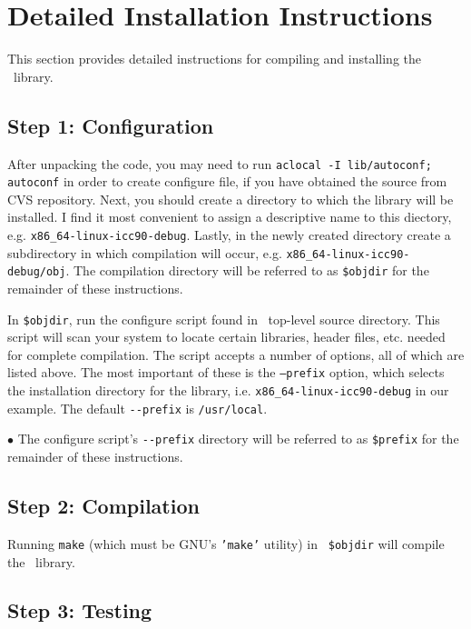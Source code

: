 \documentclass[12pt]{article}
\begin{document}
\section{Detailed Installation Instructions}

This section provides detailed instructions for compiling and
installing the \LIBINT\ library.  

\subsection{Step 1: Configuration}

After unpacking the code, you may need to run {\tt aclocal -I lib/autoconf; autoconf}
in order to create configure file, if you have obtained the source from CVS repository.
Next, you should create a directory to which the library will be installed.
I find it most convenient to assign a descriptive name to this diectory, e.g.
{\tt x86\_64-linux-icc90-debug}. Lastly, in the newly created directory
create a subdirectory in which compilation will occur, e.g.
{\tt x86\_64-linux-icc90-debug/obj}. The compilation directory will be referred to as {\tt \$objdir}
for the remainder of these instructions.

In {\tt \$objdir}, run the configure script found in \LIBINT\
top-level source directory.  This script will scan your system to locate
certain libraries, header files, etc. needed for complete compilation.
The script accepts a number of options, all of which are listed above.
The most important of these is the {\tt --prefix} option, which selects the
installation directory for the library, i.e. {\tt x86\_64-linux-icc90-debug} in our example.
The default {\tt -}{\tt -prefix} is {\tt /usr/local}.

$\bullet$ The configure script's {\tt -}{\tt -prefix} directory will be referred
to as {\tt \$prefix} for the remainder of these instructions.

\subsection{Step 2: Compilation}

Running {\tt make} (which must be GNU's {\tt 'make'} utility) in {\tt
\$objdir} will compile the \LIBINT\ library.

\subsection{Step 3: Testing}
\end{document}
